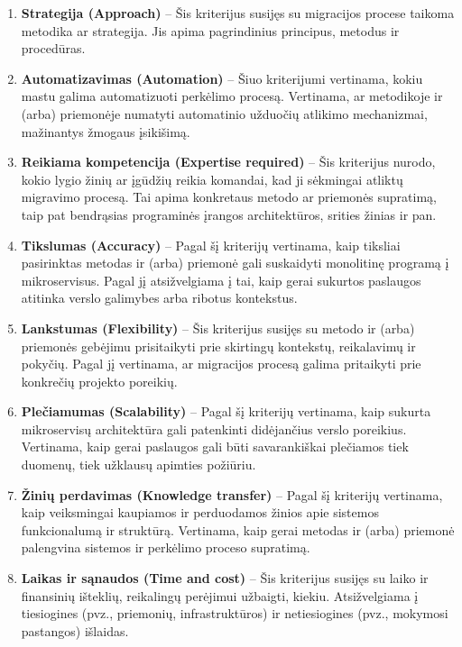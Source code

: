 \documentclass{VUMIFPSbakalaurinis}
\begin{document}
\begin{enumerate}
    
    \item \textbf{Strategija (Approach)} --  Šis kriterijus susijęs su migracijos procese taikoma metodika ar strategija. Jis apima pagrindinius principus, metodus ir procedūras.

    \item \textbf{Automatizavimas (Automation)} --  Šiuo kriterijumi vertinama, kokiu mastu galima automatizuoti perkėlimo procesą. Vertinama, ar metodikoje ir (arba) priemonėje numatyti automatinio užduočių atlikimo mechanizmai, mažinantys žmogaus įsikišimą.

    \item \textbf{Reikiama kompetencija (Expertise required)} -- Šis kriterijus nurodo, kokio lygio žinių ar įgūdžių reikia komandai, kad ji sėkmingai atliktų migravimo procesą. Tai apima konkretaus metodo ar priemonės supratimą, taip pat bendrąsias programinės įrangos architektūros, srities žinias ir pan.

    \item \textbf{Tikslumas (Accuracy)} -- Pagal šį kriterijų vertinama, kaip tiksliai pasirinktas metodas ir (arba) priemonė gali suskaidyti monolitinę programą į mikroservisus. Pagal jį atsižvelgiama į tai, kaip gerai sukurtos paslaugos atitinka verslo galimybes arba ribotus kontekstus.

    \item \textbf{Lankstumas (Flexibility)} -- Šis kriterijus susijęs su metodo ir (arba) priemonės gebėjimu prisitaikyti prie skirtingų kontekstų, reikalavimų ir pokyčių. Pagal jį vertinama, ar migracijos procesą galima pritaikyti prie konkrečių projekto poreikių.

    \item \textbf{Plečiamumas (Scalability)} -- Pagal šį kriterijų vertinama, kaip sukurta mikroservisų architektūra gali patenkinti didėjančius verslo poreikius. Vertinama, kaip gerai paslaugos gali būti savarankiškai plečiamos tiek duomenų, tiek užklausų apimties požiūriu.

    \item \textbf{Žinių perdavimas (Knowledge transfer)} -- Pagal šį kriterijų vertinama, kaip veiksmingai kaupiamos ir perduodamos žinios apie sistemos funkcionalumą ir struktūrą. Vertinama, kaip gerai metodas ir (arba) priemonė palengvina sistemos ir perkėlimo proceso supratimą.

    \item \textbf{Laikas ir sąnaudos (Time and cost)} -- Šis kriterijus susijęs su laiko ir finansinių išteklių, reikalingų perėjimui užbaigti, kiekiu. Atsižvelgiama į tiesiogines (pvz., priemonių, infrastruktūros) ir netiesiogines (pvz., mokymosi pastangos) išlaidas.
    
\end{enumerate}
\end{document}
